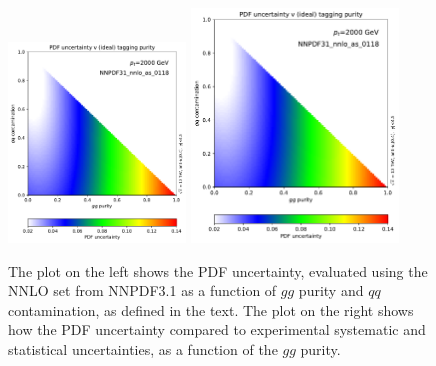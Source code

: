 \begin{figure}
\begin{center}
\includegraphics[width=0.42\textwidth, page=1]{figs/performance-plots.pdf} \hfill
\includegraphics[width=0.49\textwidth, page=2]{figs/performance-plots.pdf}
\caption{The plot on the left shows the PDF uncertainty, evaluated using the NNLO set from NNPDF3.1 as a function of $gg$ purity and $qq$ contamination, as defined in the text.
%
The plot on the right shows how the PDF uncertainty compared to experimental systematic and statistical uncertainties, as a function of the $gg$ purity. }
\label{fig:pdf_unc_studies} 
\end{center}
\end{figure}

